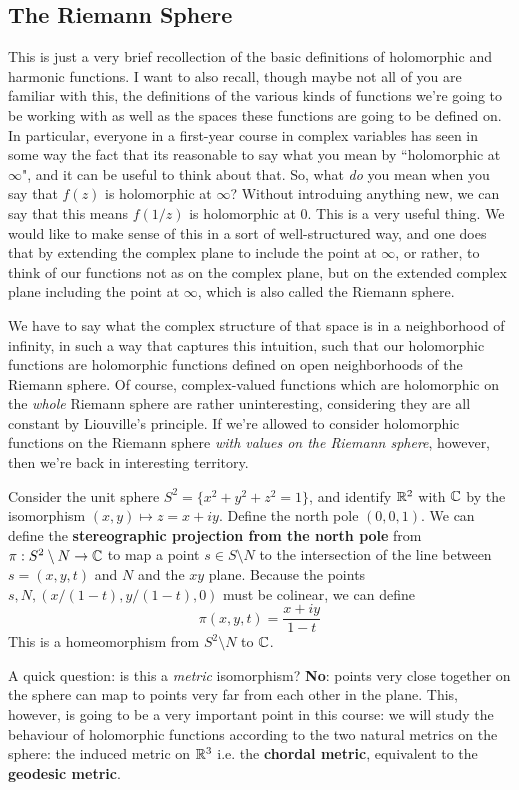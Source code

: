 \documentclass{article}
\begin{document}
\subsection{The Riemann Sphere}

This is just a very brief recollection of the basic definitions of holomorphic and harmonic functions. I want to also recall, though maybe not all of you are familiar with this, the definitions of the various kinds of functions we're going to be working with as well as the spaces these functions are going to be defined on. In particular, everyone in a first-year course in complex variables has seen in some way the fact that its reasonable to say what you mean by ``holomorphic at \(\infty\)", and it can be useful to think about that. So, what \textit{do} you mean when you say that \(f(z)\) is holomorphic at \(\infty\)? Without introduing anything new, we can say that this means \(f(1/z)\) is holomorphic at \(0\). This is a very useful thing. We would like to make sense of this in a sort of well-structured way, and one does that by extending the complex plane to include the point at \(\infty\), or rather, to think of our functions not as on the complex plane, but on the extended complex plane including the point at \(\infty\), which is also called the Riemann sphere.

We have to say what the complex structure of that space is in a neighborhood of infinity, in such a way that captures this intuition, such that our holomorphic functions are holomorphic functions defined on open neighborhoods of the Riemann sphere.
Of course, complex-valued functions which are holomorphic on the \textit{whole} Riemann sphere are rather uninteresting, considering they are all constant by Liouville's principle. If we're allowed to consider holomorphic functions on the Riemann sphere \textit{with values on the Riemann sphere}, however, then we're back in interesting territory.

\begin{definition}
Consider the unit sphere \(S^2 = \{x^2 + y^2 + z^2 = 1\}\), and identify \(\mathbb{R}^2\) with \(\mathbb{C}\) by the isomorphism \((x, y) \mapsto z = x + iy\). Define the north pole \((0, 0, 1)\). We can define the \textbf{stereographic projection from the north pole} from \(\pi: S^2 \setminus N \to \mathbb{C}\) to map a point \(s \in S \setminus N\) to the intersection of the line between \(s = (x, y, t)\) and \(N\) and the \(xy\) plane. Because the points \(s, N, (x/(1 - t), y/(1 - t), 0)\) must be colinear, we can define
\begin{equation}\pi(x, y, t) = \frac{x + iy}{1 - t}\end{equation}
This is a homeomorphism from \(S^2 \setminus N\) to \(\mathbb{C}\).
\label{def:stereographic}
\end{definition}
A quick question: is this a \textit{metric} isomorphism? \textbf{No}: points very close together on the sphere can map to points very far from each other in the plane. This, however, is going to be a very important point in this course: we will study the behaviour of holomorphic functions according to the two natural metrics on the sphere: the induced metric on \(\mathbb{R}^3\) i.e. the \textbf{chordal metric}, equivalent to the \textbf{geodesic metric}.
\end{document}
